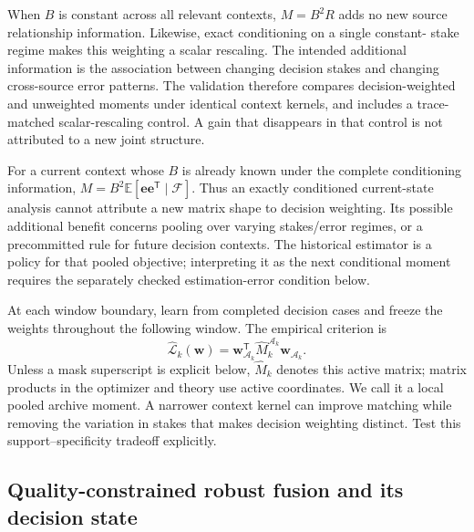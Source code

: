 \documentclass[10pt]{article}
\newcommand{\E}{\mathbb{E}}
\begin{document}
When $B$ is constant across all relevant contexts, $M=B^2R$ adds no new source
relationship information. Likewise, exact conditioning on a single constant-
stake regime makes this weighting a scalar rescaling. The intended additional
information is the association between changing decision stakes and changing
cross-source error patterns. The validation therefore compares decision-weighted
and unweighted moments under identical context kernels, and includes a
trace-matched scalar-rescaling control. A gain that disappears in that control
is not attributed to a new joint structure.

For a current context whose $B$ is already known under the complete
conditioning information, $M=B^2\E[\boldsymbol e\boldsymbol e^{\mathsf T}
\mid\mathcal F]$. Thus an exactly conditioned current-state analysis cannot
attribute a new matrix shape to decision weighting. Its possible additional
benefit concerns pooling over varying stakes/error regimes, or a precommitted
rule for future decision contexts. The historical estimator is a policy for
that pooled objective; interpreting it as the next conditional moment requires
the separately checked estimation-error condition below.

At each window boundary, learn from completed decision cases and freeze the
weights throughout the following window. The empirical criterion is
\begin{equation}
 \widehat{\mathcal L}_k(\boldsymbol w)=
 \boldsymbol w_{\mathcal A_k}^{\mathsf T}
 \widehat M_k^{\mathcal A_k}\boldsymbol w_{\mathcal A_k}.
\end{equation}
Unless a mask superscript is explicit below, $\widehat M_k$ denotes this active
matrix; matrix products in the optimizer and theory use active coordinates.
We call it a local pooled archive moment. A narrower context kernel
can improve matching while removing the variation in stakes that makes
decision weighting distinct. Test this support--specificity tradeoff explicitly.

\subsection{Quality-constrained robust fusion and its decision state}
\label{sec:fusion-rule}
\end{document}
